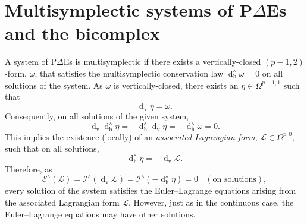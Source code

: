 \documentclass[11pt]{article} %
\numberwithin{equation}{section}
\newcommand{\upd}{\operatorname{d}}
\newcommand{\uph}{\operatorname{h}}
\newcommand{\upv}{\operatorname{v}}
\newcommand{\dv}{\upd_{\upv}\!}
\newcommand{\pde}{P$\Delta$E}
\newcommand{\mcE}{\mathcal{E}}
\newcommand{\mcI}{\mathcal{I}}
\newcommand{\msL}{\mathscr{L}}
\newcommand{\dDh}{\upd^{\vartriangle}_{\uph}}
\theoremstyle{plain}
\theoremstyle{definition}
\begin{document}
\section{Multisymplectic systems of P$\Delta$Es and the bicomplex}
\label{sec:mupde}


A system of \pde{s} is multisymplectic if there exists a vertically-closed
$(p-1,2)$-form, $\omega$, that satisfies the multisymplectic conservation law $\dDh\omega=0$ on all solutions of the system. As $\omega$ is vertically-closed, there exists an $\eta\in\Omega^{p-1,1}$ such that
\begin{equation}
\dv \eta=\omega.
\end{equation}
Consequently, on all solutions of the given
system,
\begin{equation}
\dv \dDh\!\eta=
-\dDh\!\dv \eta=
-\dDh\!\omega=0.
\end{equation}
This implies the existence (locally) of an \textit{associated Lagrangian form},
$\msL\in\Omega^{p,0}$, such that on all solutions,
\begin{equation}\label{etalag}
\dDh\!\eta=-\dv \msL.
\end{equation}
Therefore, as
\begin{equation}
\mcE^{\vartriangle}(\msL)=\mcI^{\vartriangle}(\dv 
\msL)=\mcI^{\vartriangle}(-\dDh\!\eta)=0~~~~(\text{on
solutions}),
\end{equation}
every solution of the system satisfies the Euler--Lagrange equations arising from the associated Lagrangian form $\msL$. However, just as in the continuous case, the Euler--Lagrange equations may have other solutions.
\end{document}
